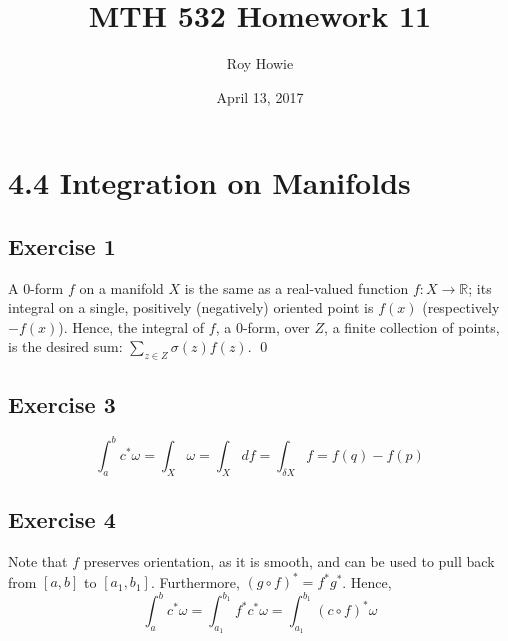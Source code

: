 \documentclass{article}
\newcommand{\R}{\mathbb{R}}
\begin{document}
\title{\vspace{-2cm}MTH 532 Homework 11}
\author{Roy Howie}
\date{April 13, 2017}
\maketitle

\section*{4.4 Integration on Manifolds}
  \subsection*{Exercise 1}
    A 0-form $f$ on a manifold $X$ is the same as a real-valued function $f
    \colon X\to\R$; its integral on a single, positively (negatively) oriented
    point is $f(x)$ (respectively $-f(x)$). Hence, the integral of $f$, a
    0-form, over $Z$, a finite collection of points, is the desired sum:
    $\sum_{z\in Z}\sigma(z)f(z)$.
    \qed

  \subsection*{Exercise 3}
    \begin{equation}
      \int_a^bc^*\omega
        =\int_X\omega
        =\int_Xdf
        =\int_{\delta X}f
        =f(q)-f(p)
        \tag*{\qed}
    \end{equation}

  \subsection*{Exercise 4}
    Note that $f$ preserves orientation, as it is smooth, and can be used to
    pull back from $[a,b]$ to $[a_1,b_1]$. Furthermore, $(g\circ f)^*=f^*g^*$.
    Hence,
    \begin{equation*}
      \int_a^bc^*\omega
        =\int_{a_1}^{b_1}f^*c^*\omega
        =\int_{a_1}^{b_1}(c\circ f)^*\omega
        \tag*{\qed}
    \end{equation*}
\end{document}
